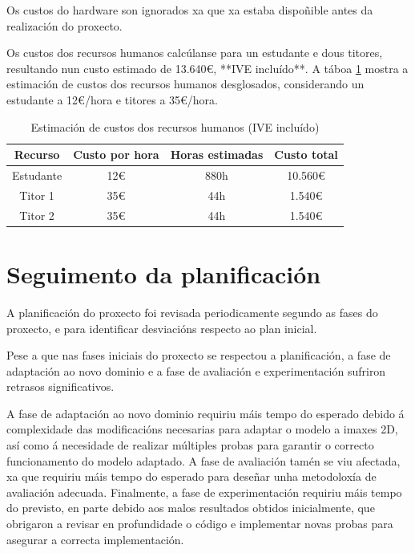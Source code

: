 Os custos do hardware son ignorados xa que xa estaba dispoñible antes da realización do proxecto.

Os custos dos recursos humanos calcúlanse para un estudante e dous titores, resultando nun custo estimado de 13.640€, **IVE incluído**. A táboa \ref{tab:estimacion_custos} mostra a estimación de custos dos recursos humanos desglosados, considerando un estudante a 12€/hora e titores a 35€/hora.

\begin{table}[h]
\centering
\begin{tabular}{|c|c|c|c|}
\hline
\textbf{Recurso} & \textbf{Custo por hora} & \textbf{Horas estimadas} & \textbf{Custo total} \\ \hline
Estudante & 12€ & 880h & 10.560€ \\ \hline
Titor 1 & 35€ & 44h & 1.540€ \\ \hline
Titor 2 & 35€ & 44h & 1.540€ \\ \hline
\end{tabular}
\caption{Estimación de custos dos recursos humanos (IVE incluído)}
\label{tab:estimacion_custos}
\end{table}

\section{Seguimento da planificación}
\label{sec:Seguimento da planificación}

A planificación do proxecto foi revisada periodicamente segundo as fases do proxecto, e para identificar desviacións respecto ao plan inicial.

Pese a que nas fases iniciais do proxecto se respectou a planificación, a fase de adaptación ao novo dominio e a fase de avaliación e experimentación sufriron retrasos significativos.

A fase de adaptación ao novo dominio requiriu máis tempo do esperado debido á complexidade das modificacións necesarias para adaptar o modelo a imaxes 2D, así como á necesidade de realizar múltiples probas para garantir o correcto funcionamento do modelo adaptado. A fase de avaliación tamén se viu afectada, xa que requiriu máis tempo do esperado para deseñar unha metodoloxía de avaliación adecuada. Finalmente, a fase de experimentación requiriu máis tempo do previsto, en parte debido aos malos resultados obtidos inicialmente, que obrigaron a revisar en profundidade o código e implementar novas probas para asegurar a correcta implementación.

